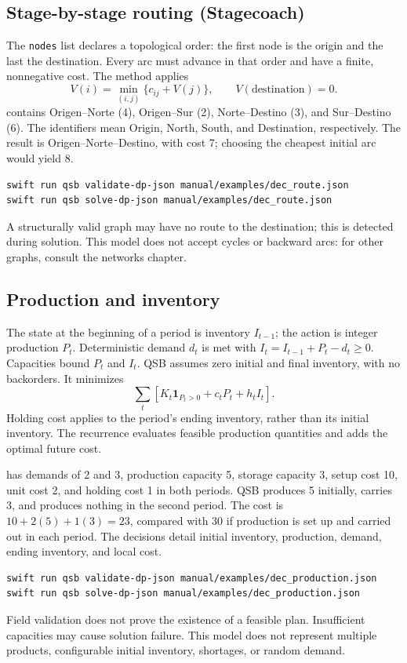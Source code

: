 \subsection{Stage-by-stage routing (Stagecoach)}
The \texttt{nodes} list declares a topological order: the first node is the
origin and the last the destination. Every arc must advance in that order and
have a finite, nonnegative cost. The method applies
\[
 V(i)=\min_{(i,j)}\{c_{ij}+V(j)\},\qquad V(\text{destination})=0.
\]
 contains Origen--Norte (4), Origen--Sur (2),
Norte--Destino (3), and Sur--Destino (6). The identifiers mean Origin, North,
South, and Destination, respectively. The result is Origen--Norte--Destino,
with cost 7; choosing the cheapest initial arc would yield 8.
\begin{lstlisting}
swift run qsb validate-dp-json manual/examples/dec_route.json
swift run qsb solve-dp-json manual/examples/dec_route.json
\end{lstlisting}
A structurally valid graph may have no route to the destination; this is
detected during solution. This model does not accept cycles or backward arcs:
for other graphs, consult the networks chapter.

\subsection{Production and inventory}
The state at the beginning of a period is inventory $I_{t-1}$; the action is
integer production $P_t$. Deterministic demand $d_t$ is met with
$I_t=I_{t-1}+P_t-d_t\geq0$. Capacities bound $P_t$ and $I_t$. QSB assumes
zero initial and final inventory, with no backorders. It minimizes
\[
 \sum_t\left[K_t\mathbf{1}_{P_t>0}+c_tP_t+h_tI_t\right].
\]
Holding cost applies to the period's ending inventory, rather than its initial
inventory. The recurrence evaluates feasible production quantities and adds
the optimal future cost.

 has demands of 2 and 3, production capacity 5,
storage capacity 3, setup cost 10, unit cost 2, and holding cost 1 in both
periods. QSB produces 5 initially, carries 3, and produces nothing in the
second period. The cost is $10+2(5)+1(3)=23$, compared with 30 if production
is set up and carried out in each period. The decisions detail initial
inventory, production, demand, ending inventory, and local cost.
\begin{lstlisting}
swift run qsb validate-dp-json manual/examples/dec_production.json
swift run qsb solve-dp-json manual/examples/dec_production.json
\end{lstlisting}
Field validation does not prove the existence of a feasible plan. Insufficient
capacities may cause solution failure. This model does not represent multiple
products, configurable initial inventory, shortages, or random demand.


